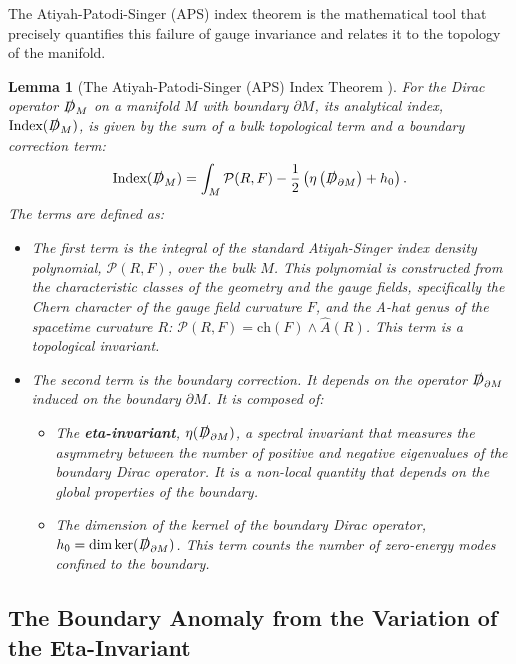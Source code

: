 \documentclass[11pt, letterpaper]{report}
\theoremstyle{plain} %
\newtheorem{lemma}[theorem]{Lemma}
\theoremstyle{definition} %
\theoremstyle{remark} %
\newcommand{\BulkM}{M}
\newcommand{\BoundaryM}{\partial\BulkM}
\newcommand{\DiracOpBulk}{\slashed{D}_{\BulkM}}
\newcommand{\DiracOpBoundary}{\slashed{D}_{\BoundaryM}}
\newcommand{\AhatGenus}{\hat{A}}
\newcommand{\EtaInv}{\eta}
\newcommand{\Index}{\text{Index}}
\begin{document}
The Atiyah-Patodi-Singer (APS) index theorem is the mathematical tool that precisely quantifies this failure of gauge invariance and relates it to the topology of the manifold.

\begin{lemma}[The Atiyah-Patodi-Singer (APS) Index Theorem \cite{AtiyahPatodiSinger1975}]
\label{lemma:aps_theorem_full_detail}
For the Dirac operator $\DiracOpBulk$ on a manifold $\BulkM$ with boundary $\BoundaryM$, its analytical index, $\Index(\DiracOpBulk)$, is given by the sum of a bulk topological term and a boundary correction term:
\begin{equation}
    \Index(\DiracOpBulk) = \int_{\BulkM} \mathcal{P}(R,F) - \frac{1}{2}\left(\EtaInv\left(\DiracOpBoundary\right) + h_0\right).
    \label{eq:aps_theorem_full_detail}
\end{equation}
The terms are defined as:
\begin{itemize}
    \item The first term is the integral of the standard Atiyah-Singer index density polynomial, $\mathcal{P}(R,F)$, over the bulk $\BulkM$. This polynomial is constructed from the characteristic classes of the geometry and the gauge fields, specifically the Chern character of the gauge field curvature $F$, and the A-hat genus of the spacetime curvature $R$: $\mathcal{P}(R,F) = \text{ch}(F) \wedge \AhatGenus(R)$. This term is a topological invariant.
    \item The second term is the boundary correction. It depends on the operator $\DiracOpBoundary$ induced on the boundary $\BoundaryM$. It is composed of:
        \begin{itemize}
            \item The \textbf{eta-invariant}, $\EtaInv(\DiracOpBoundary)$, a spectral invariant that measures the asymmetry between the number of positive and negative eigenvalues of the boundary Dirac operator. It is a non-local quantity that depends on the global properties of the boundary.
            \item The dimension of the kernel of the boundary Dirac operator, $h_0 = \dim\ker(\DiracOpBoundary)$. This term counts the number of zero-energy modes confined to the boundary.
        \end{itemize}
\end{itemize}
\end{lemma}

\subsection{The Boundary Anomaly from the Variation of the Eta-Invariant}
\label{subsec:eta_variation_anomaly}
\end{document}
